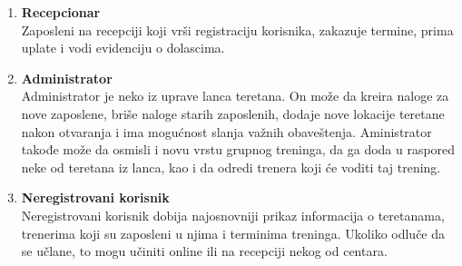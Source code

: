 \documentclass[../main.tex]{subfiles}
\begin{document}
\begin{enumerate}
  \item  \textbf{Recepcionar} \\ Zaposleni na recepciji koji vrši registraciju korisnika, zakazuje termine, prima uplate i vodi evidenciju o dolascima.
  \item \textbf{Administrator}\\
  Administrator je neko iz uprave lanca teretana. On može da kreira naloge za nove zaposlene, briše naloge starih zaposlenih, dodaje nove lokacije teretane nakon otvaranja i ima mogućnost slanja važnih obaveštenja. Aministrator takođe može da osmisli i novu vrstu grupnog treninga, da ga doda u raspored neke od teretana iz lanca, kao i da odredi trenera koji će voditi taj trening.
  \item \textbf{Neregistrovani korisnik} \\
  Neregistrovani korisnik dobija najosnovniji prikaz informacija o teretanama, trenerima koji su zaposleni u njima i terminima treninga. Ukoliko odluče da se učlane, to mogu učiniti online ili na recepciji nekog od centara.  
\end{enumerate}
\end{document}
